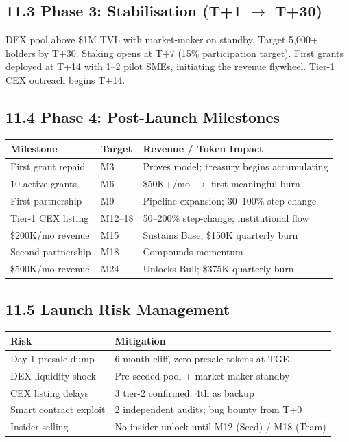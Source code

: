 \documentclass[
  paper=a4,
  ,captions=tableheading
]{scrartcl}
\begin{document}
\subsection{11.3 Phase 3: Stabilisation (T+1 $\rightarrow$ T+30)}\label{tge-phase-3}

DEX pool above \$1M TVL with market-maker on standby. Target 5,000+ holders by T+30. Staking opens at T+7 (15\% participation target). First grants deployed at T+14 with 1--2 pilot SMEs, initiating the revenue flywheel. Tier-1 CEX outreach begins T+14.

\subsection{11.4 Phase 4: Post-Launch Milestones}\label{tge-phase-4}

\begin{center}
\begin{tabular}{lll}
\toprule
\textbf{Milestone} & \textbf{Target} & \textbf{Revenue / Token Impact} \\
\midrule
First grant repaid & M3 & Proves model; treasury begins accumulating \\
10 active grants & M6 & \$50K+/mo $\rightarrow$ first meaningful burn \\
First partnership & M9 & Pipeline expansion; 30--100\% step-change \\
Tier-1 CEX listing & M12--18 & 50--200\% step-change; institutional flow \\
\$200K/mo revenue & M15 & Sustains Base; \$150K quarterly burn \\
Second partnership & M18 & Compounds momentum \\
\$500K/mo revenue & M24 & Unlocks Bull; \$375K quarterly burn \\
\bottomrule
\end{tabular}
\end{center}

\subsection{11.5 Launch Risk Management}\label{launch-risk-management}

\begin{center}
\small
\begin{tabularx}{\textwidth}{p{4.4cm} Y}
\toprule
\textbf{Risk} & \textbf{Mitigation} \\
\midrule
Day-1 presale dump & 6-month cliff, zero presale tokens at TGE \\
DEX liquidity shock & Pre-seeded pool + market-maker standby \\
CEX listing delays & 3 tier-2 confirmed; 4th as backup \\
Smart contract exploit & 2 independent audits; bug bounty from T+0 \\
Insider selling & No insider unlock until M12 (Seed) / M18 (Team) \\
\bottomrule
\end{tabularx}
\end{center}
\end{document}
